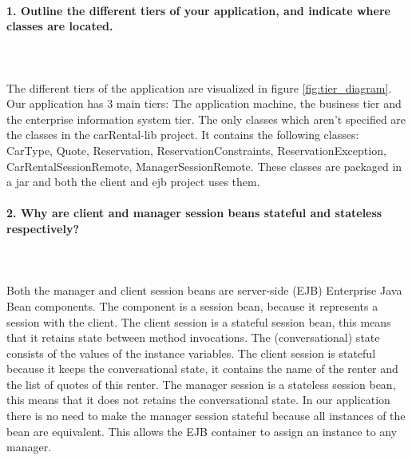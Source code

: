 \documentclass{ds-report}
\begin{document}
	\maketitle

	\paragraph{1. Outline the different tiers of your application, and indicate where classes are located.} \mbox{}\\\\
The different tiers of the application are visualized in figure \ref{fig:tier_diagram}.
Our application has 3 main tiers: The application machine, the business tier and the enterprise information system tier. The only classes which aren't specified are the classes in the carRental-lib project. It contains the following classes: CarType, Quote, Reservation, ReservationConstraints, ReservationException, CarRentalSessionRemote, ManagerSessionRemote. These classes are packaged in a jar and both the client and ejb project uses them.

	
	\paragraph{2. Why are client and manager session beans stateful and stateless respectively?} \mbox{}\\\\
Both the manager and client session beans are server-side (EJB) Enterprise Java Bean components. The component is a session bean, because it represents a session with the client.
The client session is a stateful session bean, this means that it retains state between method invocations. The (conversational) state consists of the values of the instance variables. The client session is stateful because it keeps the conversational state, it contains the name of the renter and the list of quotes of this renter.
The manager session is a stateless session bean, this means that it does not retains the conversational state. In our application there is no need to make the manager session stateful because all instances of the bean are equivalent. This allows the EJB container to assign an instance to any manager.
\end{document}
